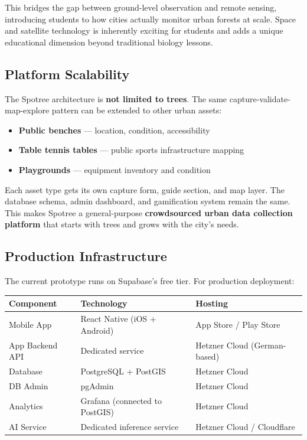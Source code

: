 \documentclass[11pt,a4paper]{article}
\newcommand{\proposalTableStart}{\arrayrulecolor{black}}
\newcommand{\proposalTableHeader}{}
\newcommand{\proposalTableEnd}{\arrayrulecolor{black}}
\begin{document}
This bridges the gap between ground-level observation and remote sensing, introducing students to how cities actually monitor urban forests at scale. Space and satellite technology is inherently exciting for students and adds a unique educational dimension beyond traditional biology lessons.

\subsection{Platform Scalability}

The Spotree architecture is \textbf{not limited to trees}. The same capture-validate-map-explore pattern can be extended to other urban assets:

\begin{itemize}
  \item \textbf{Public benches} --- location, condition, accessibility
  \item \textbf{Table tennis tables} --- public sports infrastructure mapping
  \item \textbf{Playgrounds} --- equipment inventory and condition
\end{itemize}

Each asset type gets its own capture form, guide section, and map layer. The database schema, admin dashboard, and gamification system remain the same. This makes Spotree a general-purpose \textbf{crowdsourced urban data collection platform} that starts with trees and grows with the city's needs.

\subsection{Production Infrastructure}

The current prototype runs on Supabase's free tier. For production deployment:

\begin{center}
\proposalTableStart
\begin{tabularx}{\textwidth}{|>{\raggedright\arraybackslash}p{}|>{\raggedright\arraybackslash}p{}|Y|}
\hline
\proposalTableHeader
\textbf{Component} & \textbf{Technology} & \textbf{Hosting} \\
\hline
Mobile App & React Native (iOS + Android) & App Store / Play Store \\
\hline
App Backend API & Dedicated service & Hetzner Cloud (German-based) \\
\hline
Database & PostgreSQL + PostGIS & Hetzner Cloud \\
\hline
DB Admin & pgAdmin & Hetzner Cloud \\
\hline
Analytics & Grafana (connected to PostGIS) & Hetzner Cloud \\
\hline
AI Service & Dedicated inference service & Hetzner Cloud / Cloudflare \\
\hline
\end{tabularx}
\proposalTableEnd
\end{center}
\end{document}
